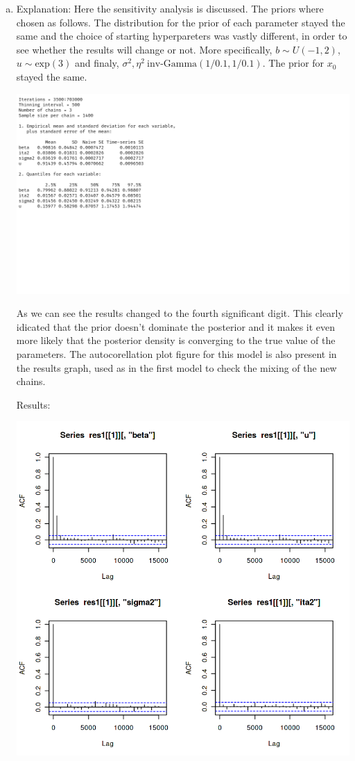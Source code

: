 \documentclass[12pt,a4paper]{article}
\begin{document}
\begin{enumerate}[(a)]
\item
Explanation: Here the sensitivity analysis is discussed. The priors where chosen as follows. The distribution for the prior of each parameter stayed the same and the choice of starting hyperpareters was vastly different, in order to see whether the results will change or not.
More specifically, $b \sim U(-1,2)$, $u \sim \text{exp}(3)$ and finaly, $\sigma^2, \eta^2 ~ \text{inv-Gamma}(1/0.1,1/0.1)$. The prior for $x_0$ stayed the same. 

\includegraphics[scale=0.25]{./images/1_table1.png}

As we can see the results changed to the fourth significant digit. This clearly idicated that the prior doesn't dominate the posterior and it makes it even more likely that the posterior density is converging to the true value of the parameters. The autocorellation plot figure for this model is also present in the results graph, used as in the first model to check the mixing of the new chains.

Results:

\includegraphics[scale=0.30]{./images/1_Figure4_acf.png}


\end{enumerate}
\end{document}
